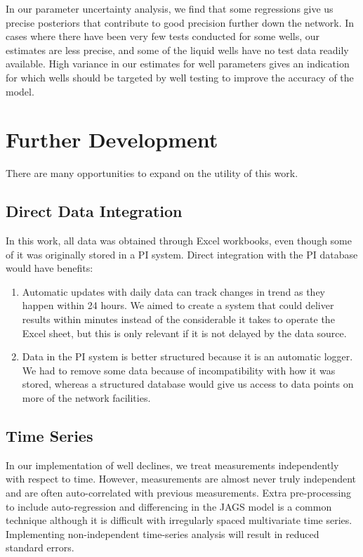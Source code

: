 \documentclass[a4paper, 12pt]{article}
\begin{document}
In our parameter uncertainty analysis, we find that some regressions give us precise posteriors that contribute to good precision further down the network. In cases where there have been very few tests conducted for some wells, our estimates are less precise, and some of the liquid wells have no test data readily available. High variance in our estimates for well parameters gives an indication for which wells should be targeted by well testing to improve the accuracy of the model.


\section{Further Development}
There are many opportunities to expand on the utility of this work.

\subsection{Direct Data Integration}
In this work, all data was obtained through Excel workbooks, even though some of it was originally stored in a PI system. Direct integration with the PI database would have benefits:

\begin{enumerate}
\item Automatic updates with daily data can track changes in trend as they happen within 24 hours.  We aimed to create a system that could deliver results within minutes instead of the considerable it takes to operate the Excel sheet, but this is only relevant if it is not delayed by the data source.
\item Data in the PI system is better structured because it is an automatic logger. We had to remove some data because of incompatibility with how it was stored, whereas a structured database would give us access to data points on more of the network facilities.
\end{enumerate}

\subsection{Time Series}
In our implementation of well declines, we treat measurements independently with respect to time. However, measurements are almost never truly independent and are often auto-correlated with previous measurements. Extra pre-processing to include auto-regression and differencing in the JAGS model is a common technique although it is difficult with irregularly spaced multivariate time series. Implementing non-independent time-series analysis will result in reduced standard errors.
\end{document}
